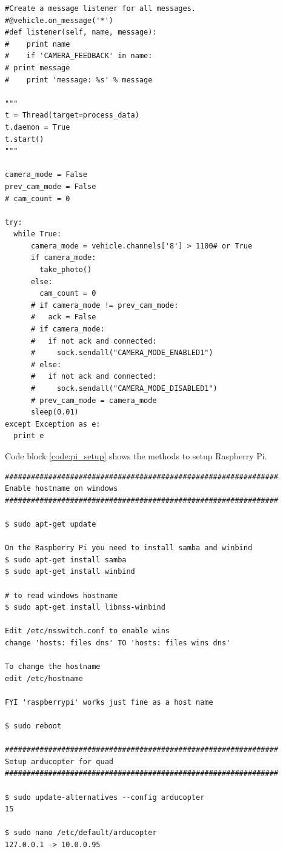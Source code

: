 \begin{appendices}
\begin{lstlisting}
#Create a message listener for all messages.
#@vehicle.on_message('*')
#def listener(self, name, message):
#    print name
#    if 'CAMERA_FEEDBACK' in name:
# print message
#    print 'message: %s' % message

"""
t = Thread(target=process_data)
t.daemon = True
t.start()
"""

camera_mode = False
prev_cam_mode = False
# cam_count = 0

try:
  while True:
      camera_mode = vehicle.channels['8'] > 1100# or True
      if camera_mode:
        take_photo()
      else:
        cam_count = 0
      # if camera_mode != prev_cam_mode:
      #   ack = False
      # if camera_mode:
      #   if not ack and connected:
      #     sock.sendall("CAMERA_MODE_ENABLED1")
      # else:
      #   if not ack and connected:
      #     sock.sendall("CAMERA_MODE_DISABLED1")
      # prev_cam_mode = camera_mode
      sleep(0.01)
except Exception as e:
  print e

\end{lstlisting}

Code block \ref{code:pi_setup} shows the methods to setup Raspberry Pi.

\begin{lstlisting}
###############################################################
Enable hostname on windows
###############################################################

$ sudo apt-get update

On the Raspberry Pi you need to install samba and winbind
$ sudo apt-get install samba
$ sudo apt-get install winbind

# to read windows hostname
$ sudo apt-get install libnss-winbind

Edit /etc/nsswitch.conf to enable wins
change 'hosts: files dns' TO 'hosts: files wins dns'

To change the hostname
edit /etc/hostname

FYI 'raspberrypi' works just fine as a host name

$ sudo reboot

###############################################################
Setup arducopter for quad
###############################################################

$ sudo update-alternatives --config arducopter
15

$ sudo nano /etc/default/arducopter 
127.0.0.1 -> 10.0.0.95


\end{lstlisting}
\end{appendices}
